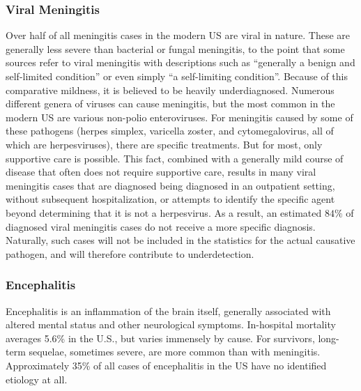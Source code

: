 \documentclass[12pt]{article}
\newcommand{\cjh}{\textcolor{blue}{cjh}}
\newcommand{\msg}[3]{(#1 $\rightarrow$ #2: #3)}
\newcommand{\mcc}[1]{\msg\cjh\cjh{#1}}
\begin{document}
        \subsubsection{Viral Meningitis}
            \label{viral-meningitis}
            Over half of all meningitis cases in the modern US are viral in nature. These are generally less severe than bacterial or fungal meningitis, to the point that some sources refer to viral meningitis with descriptions such as ``generally a benign and self-limited condition''\cite{khetsuriani2003viral} or even simply ``a self-limiting condition''\cite{balada2019cost}. Because of this comparative mildness, it is believed to be heavily underdiagnosed. Numerous different genera of viruses can cause meningitis, but the most common in the modern US are various non-polio enteroviruses. For meningitis caused by some of these pathogens (herpes simplex, varicella zoster, and cytomegalovirus, all of which are herpesviruses), there are specific treatments. But for most, only supportive care is possible. This fact, combined with a generally mild course of disease that often does not require supportive care, results in many viral meningitis cases that are diagnosed being diagnosed in an outpatient setting, without subsequent hospitalization, or attempts to identify the specific agent beyond determining that it is not a herpesvirus. As a result, an estimated $84\%$ of diagnosed viral meningitis cases do not receive a more specific diagnosis\cite{holmquist2008meningitis}. Naturally, such cases will not be included in the statistics for the actual causative pathogen, and will therefore contribute to underdetection.

        \subsubsection{Encephalitis}
            \label{encephalitis}

            Encephalitis is an inflammation of the brain itself, generally associated with altered mental status and other neurological symptoms. In-hospital mortality averages 5.6\% in the U.S., but varies immensely by cause. For survivors, long-term sequelae, sometimes severe, are more common than with meningitis. Approximately 35\% of all cases of encephalitis in the US have no identified etiology at all\cite{george2014encephalitis}.
            
\end{document}
